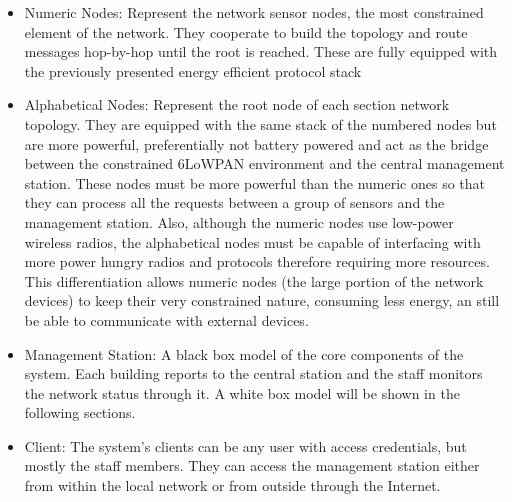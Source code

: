 \documentclass{sig-alternate-05-2015}
\begin{document}
\begin{itemize}
	\item Numeric Nodes: Represent the network sensor nodes, the most constrained element of the network. They cooperate to build the topology and route messages hop-by-hop until the root is reached. These are fully equipped with the previously presented energy efficient protocol stack
	\item Alphabetical Nodes: Represent the root node of each section network topology. They are equipped with the same stack of the numbered nodes but are more powerful, preferentially not battery powered and act as the bridge between the constrained 6LoWPAN environment and the central management station. These nodes must be more powerful than the numeric ones so that they can process all the requests between a group of sensors and the management station. Also, although the numeric nodes use low-power wireless radios, the alphabetical nodes must be capable of interfacing with more power hungry radios and protocols therefore requiring more resources. This differentiation allows numeric nodes (the large portion of the network devices) to keep their very constrained nature, consuming less energy, an still be able to communicate with external devices.
	\item Management Station: A black box model of the core components of the system. Each building reports to the central station and the staff monitors the network status through it. A white box model will be shown in the following sections.
	\item Client: The system's clients can be any user with access credentials, but mostly the staff members. They can access the management station either from within the local network or from outside through the Internet.
\end{itemize}
 
\end{document}
